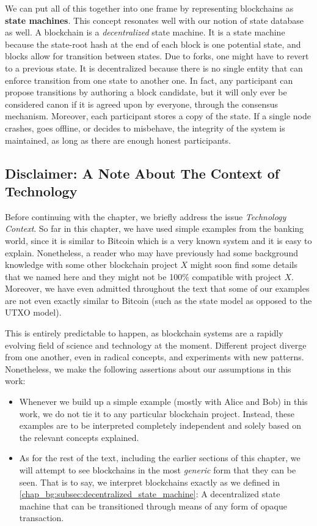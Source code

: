 We can put all of this together into one frame by representing blockchains as \textbf{state
machines}. This concept resonates well with our notion of state database as well. A blockchain is a
\textit{decentralized} state machine. It is a state machine because the state-root hash at the end
of each block is one potential state, and blocks allow for transition between states. Due to forks,
one might have to revert to a previous state. It is decentralized because there is no single entity
that can enforce transition from one state to another one. In fact, any participant can propose
transitions by authoring a block candidate, but it will only ever be considered canon if it is
agreed upon by everyone, through the consensus mechanism. Moreover, each participant stores a copy
of the state. If a single node crashes, goes offline, or decides to misbehave, the integrity of the
system is maintained, as long as there are enough honest participants.


\subsection{Disclaimer: A Note About The Context of Technology}

Before continuing with the chapter, we briefly address the issue \textit{Technology Context}. So far
in this chapter, we have used simple examples from the banking world, since it is similar to Bitcoin
which is a very known system and it is easy to explain. Nonetheless, a reader who may have
previously had some background knowledge with some other blockchain project $X$ might soon find some
details that we named here and they might not be 100\% compatible with project $X$. Moreover, we
have even admitted throughout the text that some of our examples are not even exactly similar to
Bitcoin (such as the state model as opposed to the UTXO model).

This is entirely predictable to happen, as blockchain systems are a rapidly evolving field of
science and technology at the moment. Different project diverge from one another, even in radical
concepts, and experiments with new patterns. Nonetheless, we make the following assertions about our
assumptions in this work:

\begin{itemize}
	\item Whenever we build up a simple example (mostly with Alice and Bob) in this work, we do not
	tie it to any particular blockchain project. Instead, these examples are to be interpreted
	completely independent and solely based on the relevant concepts explained.
	\item As for the rest of the text, including the earlier sections of this chapter, we will
	attempt to see blockchains in the most \textit{generic} form that they can be seen. That is to
	say, we interpret blockchains exactly as we defined in
	\ref{chap_bg:subsec:decentralized_state_machine}: A decentralized state machine that can be
	transitioned through means of any form of opaque transaction.
\end{itemize}

